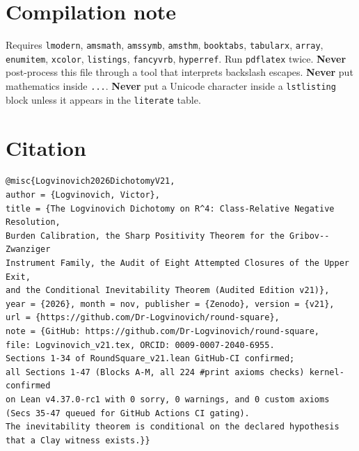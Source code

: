 \documentclass[11pt,a4paper]{article}
\theoremstyle{plain}
\theoremstyle{definition}
\theoremstyle{remark}
\renewcommand{\_}{\oldunderscore\allowbreak}
\newcommand{\Lean}[1]{\texttt{\small #1}}
\begin{document}
\section{Compilation note}
Requires \texttt{lmodern}, \texttt{amsmath}, \texttt{amssymb}, \texttt{amsthm},
\texttt{booktabs}, \texttt{tabularx}, \texttt{array}, \texttt{enumitem}, \texttt{xcolor},
\texttt{listings}, \texttt{fancyvrb}, \texttt{hyperref}. Run \texttt{pdflatex} twice.
\textbf{Never} post-process this file through a tool that interprets backslash escapes.
\textbf{Never} put mathematics inside \Lean{...}. \textbf{Never} put a Unicode character inside
a \texttt{lstlisting} block unless it appears in the \texttt{literate} table.
\section{Citation}
\begin{Verbatim}[fontsize=\scriptsize,frame=single,rulecolor=\color{darkgray}]
@misc{Logvinovich2026DichotomyV21,
author = {Logvinovich, Victor},
title = {The Logvinovich Dichotomy on R^4: Class-Relative Negative Resolution,
Burden Calibration, the Sharp Positivity Theorem for the Gribov--Zwanziger
Instrument Family, the Audit of Eight Attempted Closures of the Upper Exit,
and the Conditional Inevitability Theorem (Audited Edition v21)},
year = {2026}, month = nov, publisher = {Zenodo}, version = {v21},
url = {https://github.com/Dr-Logvinovich/round-square},
note = {GitHub: https://github.com/Dr-Logvinovich/round-square,
file: Logvinovich_v21.tex, ORCID: 0009-0007-2040-6955.
Sections 1-34 of RoundSquare_v21.lean GitHub-CI confirmed;
all Sections 1-47 (Blocks A-M, all 224 #print axioms checks) kernel-confirmed
on Lean v4.37.0-rc1 with 0 sorry, 0 warnings, and 0 custom axioms
(Secs 35-47 queued for GitHub Actions CI gating).
The inevitability theorem is conditional on the declared hypothesis
that a Clay witness exists.}}
\end{Verbatim}
\end{document}
